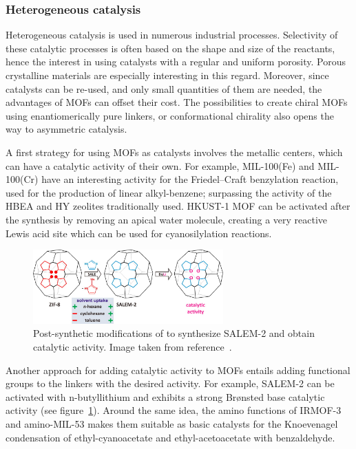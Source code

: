 \documentclass[thesis]{subfiles}
\begin{document}
\subsubsection{Heterogeneous catalysis}

Heterogeneous catalysis is used in numerous industrial processes. Selectivity of
these catalytic processes is often based on the shape and size of the reactants,
hence the interest in using catalysts with a regular and uniform porosity.
Porous crystalline materials are especially interesting in this regard.
Moreover, since catalysts can be re-used, and only small quantities of them are
needed, the advantages of MOFs can offset their cost. The possibilities to
create chiral MOFs using enantiomerically pure linkers, or conformational
chirality\cite{Tshabang2018} also opens the way to asymmetric catalysis.

A first strategy for using MOFs as catalysts involves the metallic centers,
which can have a catalytic activity of their own. For example, MIL-100(Fe) and
MIL-100(Cr) have an interesting activity for the Friedel--Craft benzylation
reaction, used for the production of linear alkyl-benzene; surpassing the
activity of the HBEA and HY zeolites traditionally used\cite{Horcajada2007}.
HKUST-1 MOF can be activated after the synthesis by removing an apical water
molecule, creating a very reactive Lewis acid site which can be used for
cyanosilylation reactions\cite{Schlichte2004}.

\begin{figure}[ht]
    \centering
    \includegraphics[width=0.65\textwidth]{figures/cited/zif8-to-salem2}
    \caption{Post-synthetic modifications of  to synthesize SALEM-2 and
    obtain catalytic activity. Image taken from reference~\cite{Karagiaridi2012}.}
    \label{fig:zif8-to-salem2}
\end{figure}

Another approach for adding catalytic activity to MOFs entails adding functional
groups to the linkers with the desired activity. For example, SALEM-2 can be
activated with \mbox{n-butyllithium} and exhibits a strong Brønsted base
catalytic activity\cite{Karagiaridi2012} (see figure~\ref{fig:zif8-to-salem2}).
Around the same idea, the amino functions of IRMOF-3 and amino-MIL-53 makes them
suitable as basic catalysts for the Knoevenagel condensation of
ethyl-cyanoacetate and ethyl-acetoacetate with benzaldehyde\cite{Gascon2009}.
\end{document}
